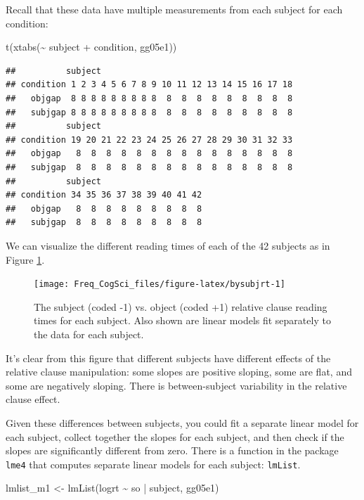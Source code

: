 \documentclass[
  12pt,
]{krantz}
\newenvironment{Shaded}{\begin{snugshade}}{\end{snugshade}}
\newcommand{\FunctionTok}[1]{\textcolor[rgb]{0.00,0.00,0.00}{#1}}
\newcommand{\NormalTok}[1]{#1}
\newcommand{\OtherTok}[1]{\textcolor[rgb]{0.56,0.35,0.01}{#1}}
\newcommand{\SpecialCharTok}[1]{\textcolor[rgb]{0.00,0.00,0.00}{#1}}
\theoremstyle{definition}
\theoremstyle{definition}
\theoremstyle{definition}
\theoremstyle{definition}
\theoremstyle{remark}
\begin{document}
Recall that these data have multiple measurements from each subject for each condition:

\begin{Shaded}
\begin{Highlighting}[]
\FunctionTok{t}\NormalTok{(}\FunctionTok{xtabs}\NormalTok{(}\SpecialCharTok{\textasciitilde{}}\NormalTok{ subject }\SpecialCharTok{+}\NormalTok{ condition, gg05e1))}
\end{Highlighting}
\end{Shaded}

\begin{verbatim}
##          subject
## condition 1 2 3 4 5 6 7 8 9 10 11 12 13 14 15 16 17 18
##   objgap  8 8 8 8 8 8 8 8 8  8  8  8  8  8  8  8  8  8
##   subjgap 8 8 8 8 8 8 8 8 8  8  8  8  8  8  8  8  8  8
##          subject
## condition 19 20 21 22 23 24 25 26 27 28 29 30 31 32 33
##   objgap   8  8  8  8  8  8  8  8  8  8  8  8  8  8  8
##   subjgap  8  8  8  8  8  8  8  8  8  8  8  8  8  8  8
##          subject
## condition 34 35 36 37 38 39 40 41 42
##   objgap   8  8  8  8  8  8  8  8  8
##   subjgap  8  8  8  8  8  8  8  8  8
\end{verbatim}

We can visualize the different reading times of each of the 42 subjects as in Figure \ref{fig:bysubjrt}.

\begin{figure}
\texttt{[image: Freq\_CogSci\_files/figure-latex/bysubjrt-1]} \caption{The subject (coded -1) vs. object (coded +1) relative clause reading times for each subject. Also shown are linear models fit separately to the data for each subject.}\label{fig:bysubjrt}
\end{figure}

It's clear from this figure that different subjects have different effects of the relative clause manipulation: some slopes are positive sloping, some are flat, and some are negatively sloping. There is between-subject variability in the relative clause effect.

Given these differences between subjects, you could fit a separate linear model for each subject, collect together the slopes for each subject, and then check if the slopes are significantly different from zero. There is a function in the package \texttt{lme4} that computes separate linear models for each subject: \texttt{lmList}.

\begin{Shaded}
\begin{Highlighting}[]
\NormalTok{lmlist\_m1 }\OtherTok{\textless{}{-}} \FunctionTok{lmList}\NormalTok{(logrt }\SpecialCharTok{\textasciitilde{}}\NormalTok{ so }\SpecialCharTok{|}\NormalTok{ subject, gg05e1)}
\end{Highlighting}
\end{Shaded}
\end{document}
